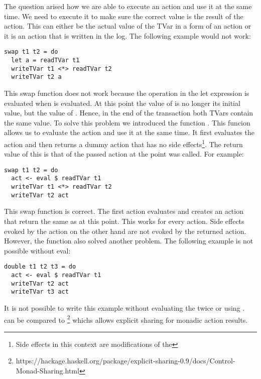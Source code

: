 The question arised how we are able to execute an action and use it at the same time. We need to execute it to make sure 
the correct value is the result of the action. This can either be the actual value of the TVar in a form of an  
action or it is an  action that is written in the log. The following example would not work:
\begin{lstlisting}
swap t1 t2 = do
  let a = readTVar t1
  writeTVar t1 <*> readTVar t2
  writeTVar t2 a
\end{lstlisting}
This swap function does not work because the  operation in the let expression is evaluated when 
 is evaluated. At this point the value of  is no longer its initial value, but the 
value of . Hence, in the end of the transaction both TVars contain the same value. To solve this problem
we introduced the function . This funcion allows us to evaluate the 
 action and use it at the same time. It first evaluates the  action and then returns a 
dummy action that has no side effects\footnote{Side effects in this context are modifications of the }. 
The return value of this is that of the passed action at the point 
was called. For example:
\begin{lstlisting}
swap t1 t2 = do
  act <- eval $ readTVar t1
  writeTVar t1 <*> readTVar t2
  writeTVar t2 act
\end{lstlisting}
This swap function is correct. The first action evaluates  and creates an action that return 
the same as  at this point. This works for every  action. Side effects evoked by the 
action on the other hand are not evoked by the returned action. However, the  function also solved another problem. The following
example is not possible without eval:
\begin{lstlisting}
double t1 t2 t3 = do 
  act <- eval $ readTVar t1
  writeTVar t2 act
  writeTVar t3 act
\end{lstlisting}
It is not possible to write this example without evaluating the  twice or using . 
 can be compared to \footnote{https://hackage.haskell.org/package/explicit-sharing-0.9/docs/Control-Monad-Sharing.html}
whichs allows explicit sharing for monadic action results.

